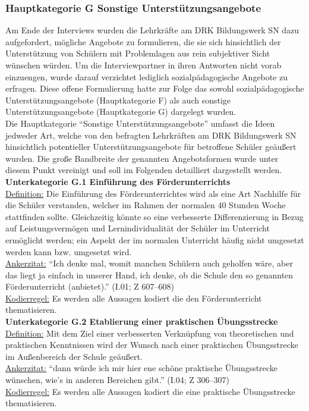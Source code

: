 \subsubsection{Hauptkategorie G Sonstige Unterstützungsangebote}
\label{sec:HauptkategorieGSonstigeUnterstützungsangebote}

Am Ende der Interviews wurden die Lehrkräfte am DRK Bildungswerk SN dazu aufgefordert, mögliche Angebote zu formulieren, die sie sich hinsichtlich der Unterstützung von Schülern mit Problemlagen aus rein subjektiver Sicht wünschen würden. Um die Interviewpartner in ihren Antworten nicht vorab einzuengen, wurde darauf verzichtet lediglich sozialpädagogische Angebote zu erfragen. Diese offene Formulierung hatte zur Folge das sowohl sozialpädagogische Unterstützungsangebote (Hauptkategorie F) als auch sonstige Unterstützungsangebote (Hauptkategorie G) dargelegt wurden.\\
Die Hauptkategorie "`Sonstige Unterstützungsangebote"' umfasst die Ideen jedweder Art, welche von den befragten Lehrkräften am DRK Bildungswerk SN hinsichtlich potentieller Unterstützungsangebote für betroffene Schüler geäußert wurden. Die große Bandbreite der genannten Angebotsformen wurde unter diesem Punkt vereinigt und soll im Folgenden detailliert dargestellt werden.\\

\noindent
\textbf{Unterkategorie G.1 Einführung des Förderunterrichts}\\
\underline{Definition:} Die Einführung des Förderunterrichtes wird als eine Art Nachhilfe für die Schüler verstanden, welcher im Rahmen der normalen 40 Stunden Woche stattfinden sollte. Gleichzeitig könnte so eine verbesserte Differenzierung in Bezug auf Leistungsvermögen und Lernindividualität der Schüler im Unterricht ermöglicht werden; ein Aspekt der im normalen Unterricht häufig nicht umgesetzt werden kann bzw. umgesetzt wird.\\
\underline{Ankerzitat:} "`Ich denke mal, womit manchen Schülern auch geholfen wäre, aber das liegt ja einfach in unserer Hand, ich denke, ob die Schule den so genannten Förderunterricht (anbietet)."' (I.01; Z 607--608)\\
\underline{Kodierregel:} Es werden alle Aussagen kodiert die den Förderunterricht thematisieren.\\

\noindent
\textbf{Unterkategorie G.2 Etablierung einer praktischen Übungsstrecke}\\
\underline{Definition:} Mit dem Ziel einer verbesserten Verknüpfung von theoretischen und praktischen Kenntnissen wird der Wunsch nach einer praktischen Übungsstrecke im Außenbereich der Schule geäußert.\\
\underline{Ankerzitat:} "`dann würde ich mir hier ene schöne praktische Übungsstrecke wünschen, wie's in anderen Bereichen gibt."' (I.04; Z 306--307)\\
\underline{Kodierregel:} Es werden alle Aussagen kodiert die eine praktische Übungsstrecke thematisieren.\\

